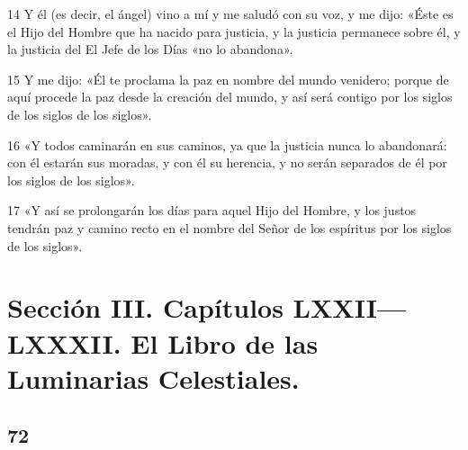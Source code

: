 \par 14 Y él (es decir, el ángel) vino a mí y me saludó con su voz, y me dijo: «Éste es el Hijo del Hombre que ha nacido para justicia, y la justicia permanece sobre él, y la justicia del El Jefe de los Días «no lo abandona».
\par 15 Y me dijo: «Él te proclama la paz en nombre del mundo venidero; porque de aquí procede la paz desde la creación del mundo, y así será contigo por los siglos de los siglos de los siglos».
\par 16 «Y todos caminarán en sus caminos, ya que la justicia nunca lo abandonará: con él estarán sus moradas, y con él su herencia, y no serán separados de él por los siglos de los siglos».
\par 17 «Y así se prolongarán los días para aquel Hijo del Hombre, y los justos tendrán paz y camino recto en el nombre del Señor de los espíritus por los siglos de los siglos».

\part{Sección III. Capítulos LXXII—LXXXII. El Libro de las Luminarias Celestiales.}

\chapter{72}

